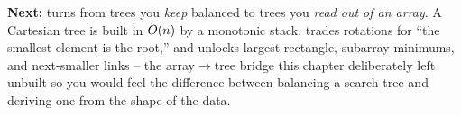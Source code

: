 \begin{lastword}
\medskip
\textbf{Next:}  turns from trees you \emph{keep} balanced to trees you \emph{read out of an array}.
A Cartesian tree is built in $O(n)$ by a monotonic stack, trades rotations for ``the smallest element is the
root,'' and unlocks largest-rectangle, subarray minimums, and next-smaller links -- the array$\to$tree bridge
this chapter deliberately left unbuilt so you would feel the difference between balancing a search tree and
deriving one from the shape of the data.
\end{lastword}
